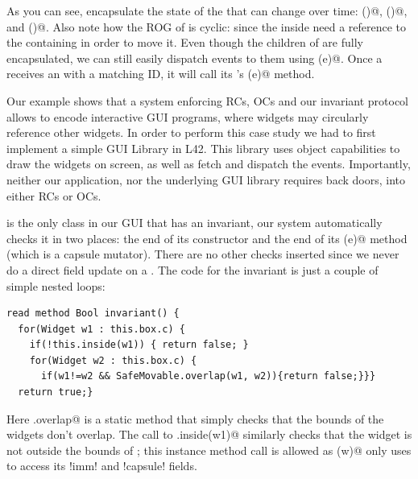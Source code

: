 As you can see, \Q@Box@es encapsulate the state of the \Q@SafeMovable@s that can change over time:
\Q@left()@, \Q@top()@, and \Q@children()@. Also note how the ROG of \Q@Box@ is cyclic: since
the \Q@MoveAction@s inside \Q@Button@s need a reference to the containing \Q@Box@ in order to move it.
Even though the children of \Q@SafeMovable@s are fully encapsulated, we can still easily dispatch events to them using \Q@dispatch(e)@. Once a \Q@Button@ receives an \Q@Event@ with a matching ID, it will call its \Q@Action@'s \Q@process(e)@ method. 

Our example shows that 
a system enforcing RCs, OCs and our invariant protocol allows to encode interactive GUI programs, where widgets may circularly reference other widgets.
In order to perform this case study we had to first implement a simple GUI Library in L42. This library uses object capabilities to draw the widgets on screen, as well as fetch and dispatch the events. Importantly, neither our application, nor the underlying GUI library requires back doors, into either RCs or OCs.

\Q@SafeMovable@ is the only class in our GUI that has an invariant, our system automatically checks it in two places: the end of its constructor and the end of its \Q@dispatch(e)@ method (which is a capsule mutator). There are no other checks inserted since we never do a direct field update on a \Q@SafeMovable@. The code for the invariant is just a couple of simple nested loops:
\begin{lstlisting}
read method Bool invariant() {
  for(Widget w1 : this.box.c) {
    if(!this.inside(w1)) { return false; }
    for(Widget w2 : this.box.c) {
      if(w1!=w2 && SafeMovable.overlap(w1, w2)){return false;}}}
  return true;}
\end{lstlisting}

Here \Q@SafeMovable.overlap@ is a static method that simply checks that the bounds of the widgets don't overlap. The call to \Q@this.inside(w1)@ similarly checks that the widget is not outside the bounds of \Q@this@; this instance method call is allowed as \Q@inside(w)@ only uses \Q@this@ to access its \Q!imm! and \Q!capsule! fields.

